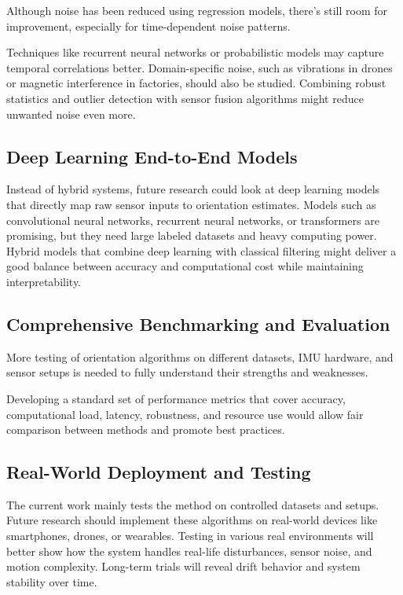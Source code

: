 \documentclass{iutbscthesis}
\begin{document}
Although noise has been reduced using regression models, there's still room for improvement, especially for time-dependent noise patterns.

Techniques like recurrent neural networks or probabilistic models may capture temporal correlations better. Domain-specific noise, such as vibrations in drones or magnetic interference in factories, should also be studied. Combining robust statistics and outlier detection with sensor fusion algorithms might reduce unwanted noise even more.

\subsection{Deep Learning End-to-End Models}

Instead of hybrid systems, future research could look at deep learning models that directly map raw sensor inputs to orientation estimates. Models such as convolutional neural networks, recurrent neural networks, or transformers are promising, but they need large labeled datasets and heavy computing power. Hybrid models that combine deep learning with classical filtering might deliver a good balance between accuracy and computational cost while maintaining interpretability.

\subsection{Comprehensive Benchmarking and Evaluation}

More testing of orientation algorithms on different datasets, IMU hardware, and sensor setups is needed to fully understand their strengths and weaknesses.

Developing a standard set of performance metrics that cover accuracy, computational load, latency, robustness, and resource use would allow fair comparison between methods and promote best practices.

\subsection{Real-World Deployment and Testing}

The current work mainly tests the method on controlled datasets and setups. Future research should implement these algorithms on real-world devices like smartphones, drones, or wearables. Testing in various real environments will better show how the system handles real-life disturbances, sensor noise, and motion complexity. Long-term trials will reveal drift behavior and system stability over time.
\end{document}

